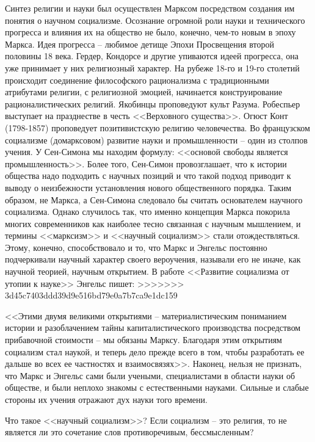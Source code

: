 \documentclass{book}
\begin{document}
Синтез религии и науки был осуществлен Марксом посред­ством создания им понятия о научном социализме.  Осознание огромной роли науки и технического прогресса и влияния их на общество не было, конечно, чем-то новым в эпоху Маркса. Идея прогресса -- любимое детище Эпохи Просвещения второй половины 18 века. Гердер, Кондорсе и другие упиваются идеей прогресса, она уже принимает у них религиозный характер. На рубеже 18-го и 19-го столетий происходит соединение философского рационализма с традиционными атрибутами религии, с религиозной эмоцией, начинается конструирование рационалистических религий. Якобинцы проповедуют культ Разума. Робеспьер выступает на празднестве в честь <<Верховного существа>>. Огюст Конт (1798-1857) проповедует позитивистскую религию человечества. Во французском социализме (домарксовом) развитие науки и промышленности -- один из столпов учения. У Сен-Симона мы находим формулу: <<основой свободы является промышленность>>. Более того, Сен-Симон провозглашает, что к истории общества надо подходить 
с научных позиций и что такой подход приводит к выводу о неизбежности установления нового общественного порядка. Таким образом, не Маркса, а Сен-Симона следовало бы считать основателем научного социализма. Однако случилось так, что именно концепция Маркса покорила многих современников как наиболее тесно связанная с научным мышлением, и термины <<марксизм>> и <<научный социализм>> стали отождествляться. Этому, конечно, способствовало и то, что Маркс и Энгельс постоянно подчеркивали научный характер своего вероучения, называли его не иначе, как научной теорией, научным открытием. В работе <<Развитие социализма от утопии к науке>> Энгельс пишет:
>>>>>>> 3d45c7403ddd39d9e516bd79e0a7b7ca9e1dc159

<<Этими двумя великими открытиями -- материалистическим пониманием истории и разоблачением тайны капиталистиче­ского производства посредством прибавочной стоимости -- мы обязаны Марксу. Благодаря этим открытиям социализм стал наукой,  и теперь дело прежде всего в том, чтобы разработать ее дальше во всех ее частностях и взаимосвязях>>. Наконец, нельзя не признать, что Маркс и Энгельс сами были учеными, специалистами в области науки об обществе, и были неплохо знакомы с естественными науками. Сильные и слабые стороны их учения отражают дух науки того времени.

Что такое <<научный социализм>>? Если социализм -- это ре­лигия, то не является ли это сочетание слов противоречивым, бессмысленным?
\end{document}
